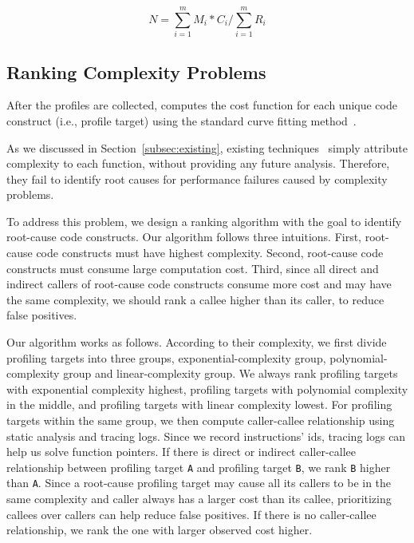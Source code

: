 {{%
\begin{equation} \label{eq:mark}
N = \sum\limits_{i=1}^m M_i*C_i\Big/\sum\limits_{i=1}^m R_i
\end{equation}

\subsection{Ranking Complexity Problems}

After the profiles are collected, \Tool computes
the cost function for each unique code construct
(i.e., profile target) using the standard curve fitting 
method~\cite{curve-fitting,curve-bounding}. 

 
As we discussed in Section~\ref{subsec:existing}, 
existing techniques~\cite{Aprof1,Aprof2,AlgoProf} 
simply attribute complexity to each function, 
without providing any future analysis. 
Therefore, they fail to identify root causes for 
performance failures caused by complexity problems. 

To address this problem, we design a ranking algorithm 
with the goal to identify root-cause code constructs.
Our algorithm follows three intuitions. 
First, root-cause code constructs must have highest complexity.
Second, root-cause code constructs must consume large computation cost.
Third, since all direct and indirect callers of root-cause code constructs 
consume more cost and may have the same complexity, 
we should rank a callee higher than its caller, 
to reduce false positives. 


Our algorithm works as follows. 
According to their complexity, 
we first divide profiling targets into three groups, 
exponential-complexity group, 
polynomial-complexity group and linear-complexity group.
We always rank profiling targets with exponential complexity highest,
profiling targets with polynomial complexity in the middle,
and profiling targets with linear complexity lowest. 
For profiling targets within the same group, 
we then compute caller-callee relationship using static analysis and tracing logs.
Since we record instructions' ids, tracing logs can help us solve function pointers. 
If there is direct or indirect caller-callee relationship 
between profiling target \texttt{A}
and profiling target \texttt{B}, we rank \texttt{B} higher than \texttt{A}.
Since a root-cause profiling target may 
cause all its callers to be in the same complexity and 
caller always has a larger cost than its callee, 
prioritizing callees over callers can help reduce false positives.
If there is no caller-callee relationship,
we rank the one with larger observed cost higher.



}}
